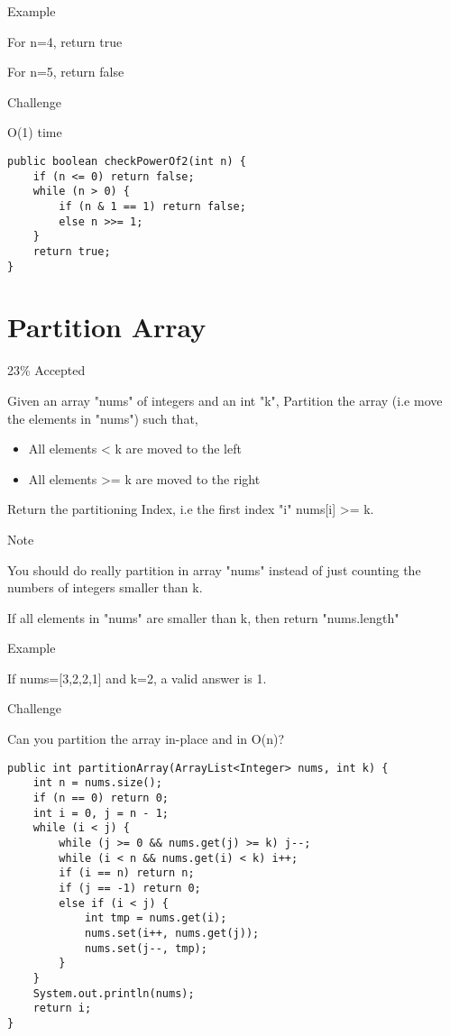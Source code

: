 \documentclass[9pt, b5paaper]{book}
\begin{document}
Example

For n=4, return true

For n=5, return false

Challenge

O(1) time
\begin{verbatim}
public boolean checkPowerOf2(int n) {
    if (n <= 0) return false;
    while (n > 0) {
        if (n & 1 == 1) return false;
        else n >>= 1;
    }
    return true;
}
\end{verbatim}
\section{Partition Array}
\label{sec-1-49}

23\% Accepted

Given an array "nums" of integers and an int "k", Partition the array (i.e move the elements in "nums") such that,

\begin{itemize}
\item All elements < k are moved to the left

\item All elements >= k are moved to the right
\end{itemize}

Return the partitioning Index, i.e the first index "i" nums[i] >= k.

Note

You should do really partition in array "nums" instead of just counting the numbers of integers smaller than k.

If all elements in "nums" are smaller than k, then return "nums.length"

Example

If nums=[3,2,2,1] and k=2, a valid answer is 1.

Challenge

Can you partition the array in-place and in O(n)?
\begin{verbatim}
public int partitionArray(ArrayList<Integer> nums, int k) {
    int n = nums.size();
    if (n == 0) return 0;
    int i = 0, j = n - 1;
    while (i < j) {
        while (j >= 0 && nums.get(j) >= k) j--;
        while (i < n && nums.get(i) < k) i++;
        if (i == n) return n;
        if (j == -1) return 0;
        else if (i < j) {
            int tmp = nums.get(i);
            nums.set(i++, nums.get(j));
            nums.set(j--, tmp);
        }
    }
    System.out.println(nums);
    return i;
}
\end{verbatim}
\end{document}
